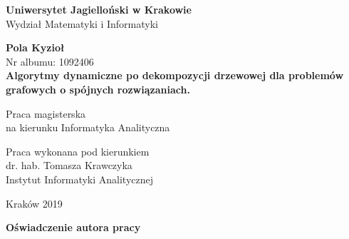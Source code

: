 \documentclass[12pt, oneside]{report}
\begin{document}
  
\thispagestyle{empty}
\begin{titlepage}
    \begin{center}

           \Large
    \textbf{Uniwersytet Jagielloński w Krakowie}\vspace{0.2cm}\\ Wydział Matematyki i Informatyki
               \vspace*{1cm}
               
         \vspace{3cm}
         \Large
          \textbf{Pola Kyzioł}\\\vspace{0.5cm}
         \normalsize Nr albumu: 1092406\\
             \vspace{2cm}
        \Huge
        \textbf{Algorytmy dynamiczne po dekompozycji drzewowej dla problemów grafowych o spójnych rozwiązaniach.}
      
        \vspace{1.5cm}
        \normalsize
        Praca magisterska\\
        na kierunku Informatyka Analityczna\\ \vspace{0.15cm}
        
        \vfill
        \vspace{2cm}
       \begin{minipage}{1\textwidth}
\begin{flushright}
Praca wykonana pod kierunkiem\\
dr. hab. Tomasza Krawczyka\\
Instytut Informatyki Analitycznej 
\end{flushright}
\end{minipage}
        
        \vspace{2cm}
        \begin{center}
      Kraków 2019
        \end{center}
    \end{center}
\end{titlepage}

\newpage 
 \thispagestyle{empty}
\vspace{2.5cm}
\begin{flushleft}
\large \textbf{Oświadczenie autora pracy}\vspace{0.6cm}\\
\end{flushleft}
\end{document}
